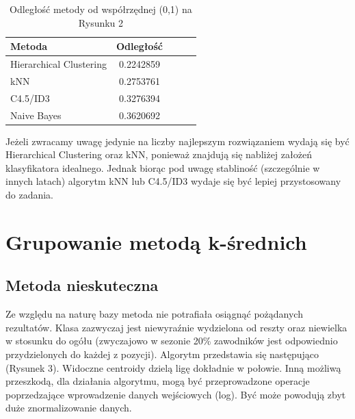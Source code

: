 \documentclass[twoside,twocolumn]{article}
\begin{document}
\begin{table}[hbt!]
\centering
\caption{Odległość metody od współrzędnej (0,1) na Rysunku 2}
\begin{tabular}{l*{4}{c}}
Metoda & Odległość \\
\hline
Hierarchical Clustering & 0.2242859 \\
kNN & 0.2753761 \\
C4.5/ID3 & 0.3276394 \\
Naive Bayes & 0.3620692 \\
\end{tabular}
\end{table}
\newpage
\indent Jeżeli zwracamy uwagę jedynie na liczby najlepszym rozwiązaniem wydają się być Hierarchical Clustering oraz kNN, ponieważ znajdują się nabliżej założeń klasyfikatora idealnego. Jednak biorąc pod uwagę stabliność (szczególnie w innych latach) algorytm kNN lub C4.5/ID3 wydaje się być lepiej przystosowany do zadania.


\section{Grupowanie metodą k-średnich}

\subsection{Metoda nieskuteczna}

\indent Ze względu na naturę bazy metoda nie potrafiała osiągnąć pożądanych rezultatów. Klasa zazwyczaj jest niewyraźnie wydzielona od reszty oraz niewielka w stosunku do ogółu (zwyczajowo w sezonie 20\% zawodników jest odpowiednio przydzielonych do każdej z pozycji). Algorytm przedstawia się następująco (Rysunek 3). Widoczne centroidy dzielą ligę dokładnie w połowie. Inną możliwą przeszkodą, dla działania algorytmu, mogą być przeprowadzone operacje poprzedzające wprowadzenie danych wejściowych (log). Być może powodują zbyt duże znormalizowanie danych.
\end{document}
